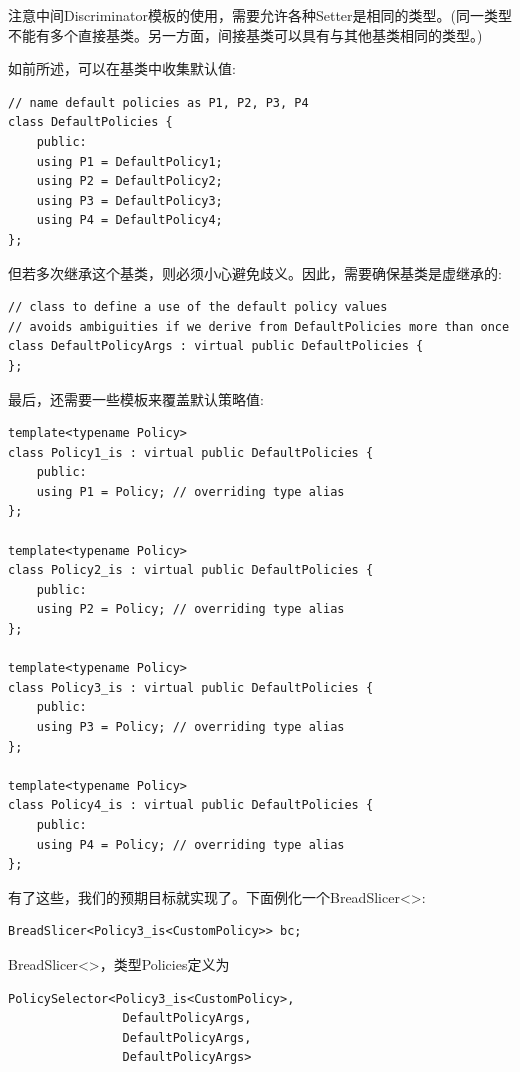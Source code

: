 注意中间Discriminator模板的使用，需要允许各种Setter是相同的类型。(同一类型不能有多个直接基类。另一方面，间接基类可以具有与其他基类相同的类型。)

如前所述，可以在基类中收集默认值:

\begin{lstlisting}[style=styleCXX]
// name default policies as P1, P2, P3, P4
class DefaultPolicies {
	public:
	using P1 = DefaultPolicy1;
	using P2 = DefaultPolicy2;
	using P3 = DefaultPolicy3;
	using P4 = DefaultPolicy4;
};
\end{lstlisting}

但若多次继承这个基类，则必须小心避免歧义。因此，需要确保基类是虚继承的:

\begin{lstlisting}[style=styleCXX]
// class to define a use of the default policy values
// avoids ambiguities if we derive from DefaultPolicies more than once
class DefaultPolicyArgs : virtual public DefaultPolicies {
};
\end{lstlisting}

最后，还需要一些模板来覆盖默认策略值:

\begin{lstlisting}[style=styleCXX]
template<typename Policy>
class Policy1_is : virtual public DefaultPolicies {
	public:
	using P1 = Policy; // overriding type alias
};

template<typename Policy>
class Policy2_is : virtual public DefaultPolicies {
	public:
	using P2 = Policy; // overriding type alias
};

template<typename Policy>
class Policy3_is : virtual public DefaultPolicies {
	public:
	using P3 = Policy; // overriding type alias
};

template<typename Policy>
class Policy4_is : virtual public DefaultPolicies {
	public:
	using P4 = Policy; // overriding type alias
};
\end{lstlisting}

有了这些，我们的预期目标就实现了。下面例化一个BreadSlicer<>:

\begin{lstlisting}[style=styleCXX]
BreadSlicer<Policy3_is<CustomPolicy>> bc;
\end{lstlisting}

BreadSlicer<>，类型Policies定义为

\begin{lstlisting}[style=styleCXX]
PolicySelector<Policy3_is<CustomPolicy>,
				DefaultPolicyArgs,
				DefaultPolicyArgs,
				DefaultPolicyArgs>
\end{lstlisting}

